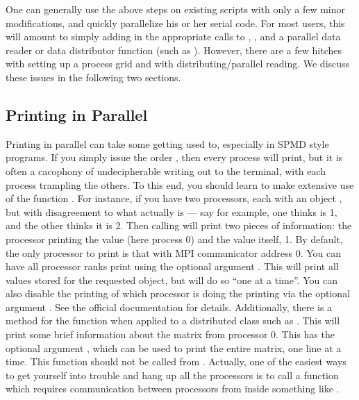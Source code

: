 One can generally use the above steps on existing  scripts with only a few minor modifications, and
quickly parallelize his or her serial code.   For most users, this will amount to simply adding in the appropriate calls to , , and a parallel data reader or data distributor function (such as ).  However, there are a few hitches with setting up a process grid and with distributing/parallel reading.  We discuss these issues in the following two sections.

\subsection[]{Printing in Parallel}

Printing in parallel can take some getting used to, especially in SPMD style programs.  If you simply issue the order , then every process will print, but it is often a cacophony of undecipherable writing out to the terminal, with each process trampling the others.  
\np
To this end, you should learn to make extensive use of the  function .  For instance, if you have two processors, each with an object , but with disagreement to what  actually is --- say for example, one thinks  is 1, and the other thinks it is 2.  Then calling  will print two pieces of information:  the processor printing the value (here process 0) and the value itself, 1.  By default, the only processor to print is that with MPI communicator address 0.  You can have all processor ranks print using the optional argument .  This will print all values stored for the requested object, but will do so ``one at a time''.  You can also disable the printing of which processor is doing the printing via the optional argument .  See the official  documentation for details.
\np
Additionally, there is a method for the  function when applied to a distributed class such as .  This will print some brief information about the matrix from processor 0.  This has the optional argument , which can be used to print the entire matrix, one line at a time.
\np
This function should not be called from .  Actually, one of the easiest ways to get yourself into trouble and hang up all the processors is to call a function which requires communication between processors from inside something like .

